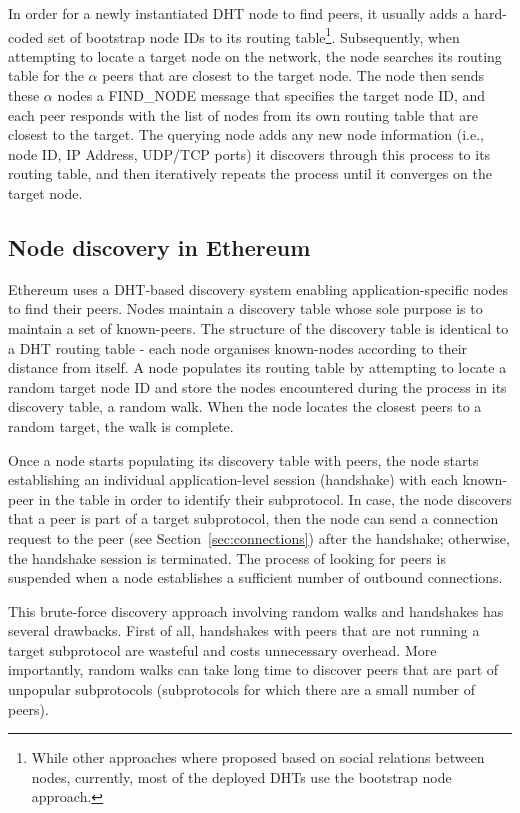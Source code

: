 In order for a newly instantiated DHT node to find peers, it usually adds a hard-coded set of bootstrap node IDs to its routing table\footnote{While other approaches where proposed based on social relations between nodes, currently, most of the deployed DHTs use the bootstrap node approach.}. Subsequently, when attempting to locate a target node on the network, the node searches its routing table for the $\alpha$ peers that are closest to the target node. The node then sends these $\alpha$ nodes a FIND\_NODE message that specifies the target node ID, and each peer responds with the list of nodes from its own routing table that are closest to the target. The querying node adds any new node information (i.e., node ID, IP Address, UDP/TCP ports) it discovers through this process to its routing table, and then iteratively repeats the process until it converges on the target node.


\subsection{Node discovery in Ethereum}
Ethereum uses a DHT-based discovery system enabling application-specific nodes to find their peers. Nodes maintain a discovery table whose sole purpose is to maintain a set of known-peers. The structure of the discovery table is identical to a DHT routing table - each node organises known-nodes according to their distance from itself. A node populates its routing table by attempting to locate a random target node ID and store the nodes encountered during the process in its discovery table, \ie a random walk. When the node locates the closest peers to a random target, the walk is complete. 

Once a node starts populating its discovery table with peers, the node starts establishing an individual application-level session (\ie handshake) with each known-peer in the table in order to identify their subprotocol. In case, the node discovers that a peer is part of a target subprotocol, then the node can send a connection request to the peer (see Section~\ref{sec:connections}) after the handshake; otherwise, the handshake session is terminated. The process of looking for peers is suspended when a node establishes a sufficient number of outbound connections.

This brute-force discovery approach involving random walks and handshakes has several drawbacks. First of all, handshakes with peers that are not running a target subprotocol are wasteful and costs unnecessary overhead. More importantly, random walks can take long time to discover peers that are part of unpopular subprotocols (\ie subprotocols for which there are a small number of peers). 

